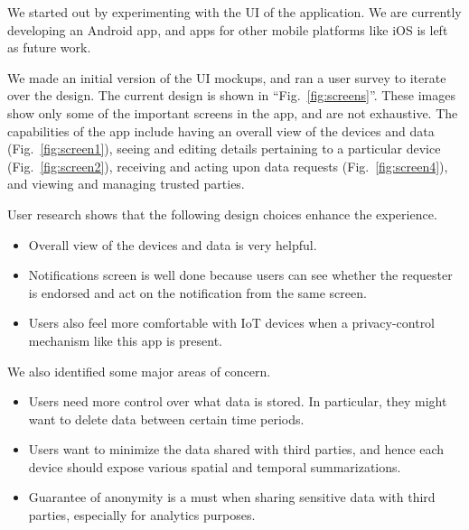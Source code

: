 We started out by experimenting with the UI of the application. We are currently developing an Android app, and apps for other mobile platforms like iOS is left as future work.

We made an initial version of the UI mockups, and ran a user survey to iterate over the design. The current design is shown in ``Fig.~\ref{fig:screens}''. These images show only some of the important screens in the app, and are not exhaustive. The capabilities of the app include having an overall view of the devices and data (Fig.~\ref{fig:screen1}), seeing and editing details pertaining to a particular device (Fig.~\ref{fig:screen2}), receiving and acting upon data requests (Fig.~\ref{fig:screen4}), and viewing and managing trusted parties.

User research shows that the following design choices enhance the experience.

\begin{itemize}
	\item Overall view of the devices and data is very helpful.
	\item Notifications screen is well done because users can see whether the requester is endorsed and act on the notification from the same screen.
	\item Users also feel more comfortable with IoT devices when a privacy-control mechanism like this app is present.
\end{itemize}

We also identified some major areas of concern.

\begin{itemize}
	\item Users need more control over what data is stored. In particular, they might want to delete data between certain time periods.
	\item Users want to minimize the data shared with third parties, and hence each device should expose various spatial and temporal summarizations. 
	\item Guarantee of anonymity is a must when sharing sensitive data with third parties, especially for analytics purposes.
\end{itemize}